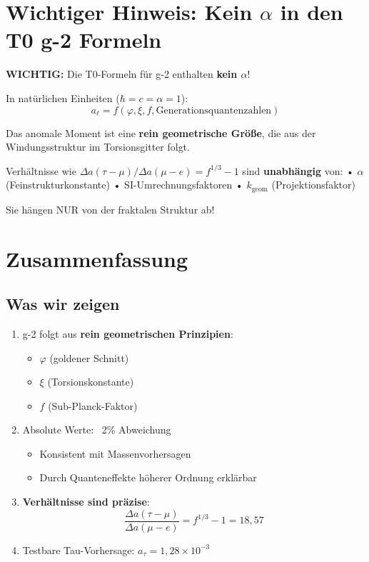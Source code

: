 	\section{Wichtiger Hinweis: Kein $\alpha$ in den T0 g-2 Formeln}
	
	\textbf{WICHTIG:}
	Die T0-Formeln für g-2 enthalten \textbf{kein $\alpha$}!
	
	In natürlichen Einheiten ($\hbar = c = \alpha = 1$):
	\[ a_\ell = f(\varphi, \xi, f, \text{Generationsquantenzahlen}) \]
	
	Das anomale Moment ist eine \textbf{rein geometrische Größe},
	die aus der Windungsstruktur im Torsionsgitter folgt.
	
	Verhältnisse wie $\Delta a(\tau-\mu)/\Delta a(\mu-e) = f^{1/3} - 1$ sind
	\textbf{unabhängig} von:
	• $\alpha$ (Feinstrukturkonstante)
	• SI-Umrechnungsfaktoren
	• $k_{\text{geom}}$ (Projektionsfaktor)
	
	Sie hängen NUR von der fraktalen Struktur ab!
	\section{Zusammenfassung}
	
	\subsection{Was wir zeigen}
	
	\begin{enumerate}
		\item g-2 folgt aus \textbf{rein geometrischen Prinzipien}:
		\begin{itemize}
			\item $\varphi$ (goldener Schnitt)
			\item $\xi$ (Torsionskonstante)
			\item $f$ (Sub-Planck-Faktor)
		\end{itemize}
		
		\item Absolute Werte: ~2\% Abweichung
		\begin{itemize}
			\item Konsistent mit Massenvorhersagen
			\item Durch Quanteneffekte höherer Ordnung erklärbar
		\end{itemize}
		
		\item \textbf{Verhältnisse sind präzise}:
		\begin{equation}
			\frac{\Delta a(\tau - \mu)}{\Delta a(\mu - e)} = f^{1/3} - 1 = 18{,}57
		\end{equation}
		
		\item Testbare Tau-Vorhersage: $a_\tau = 1{,}28 \times 10^{-3}$
	\end{enumerate}
	
